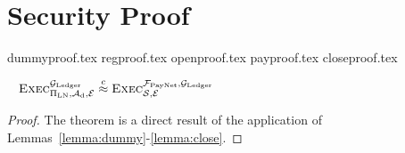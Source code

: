 \section{Security Proof}
  {dummyproof.tex}
  {regproof.tex}
  {openproof.tex}
  {payproof.tex}
  {closeproof.tex}

  \begin{theorem} \
    \label{theorem:simulation}
    $\textsc{Exec}^{\mathcal{G}_{\mathrm{Ledger}}}_{\Pi_{\mathrm{LN}}, \mathcal{A}_{\mathrm{d}},
    \mathcal{E}} \overset{c}{\approx} \textsc{Exec}^{\mathcal{F}_{\mathrm{PayNet}},
    \mathcal{G}_{\mathrm{Ledger}}}_{\mathcal{S}, \mathcal{E}}$
  \end{theorem}

  \begin{proof}
    The theorem is a direct result of the application of
    Lemmas~\ref{lemma:dummy}-\ref{lemma:close}.
  \end{proof}
